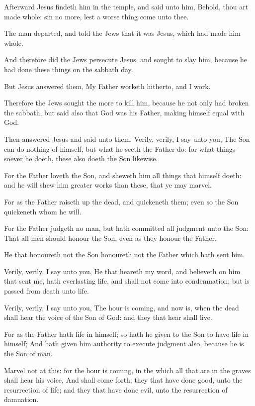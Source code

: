 \verse Afterward Jesus findeth him in the temple, and said unto him, Behold, thou art made whole: sin no more, lest a worse thing come unto thee.

\verse The man departed, and told the Jews that it was Jesus, which had made him whole.

\verse And therefore did the Jews persecute Jesus, and sought to slay him, because he had done these things on the sabbath day.

\verse But Jesus answered them, My Father worketh hitherto, and I work.

\verse Therefore the Jews sought the more to kill him, because he not only had broken the sabbath, but said also that God was his Father, making himself equal with God.

\verse Then answered Jesus and said unto them, Verily, verily, I say unto you, The Son can do nothing of himself, but what he seeth the Father do: for what things soever he doeth, these also doeth the Son likewise.

\verse For the Father loveth the Son, and sheweth him all things that himself doeth: and he will shew him greater works than these, that ye may marvel.

\verse For as the Father raiseth up the dead, and quickeneth them; even so the Son quickeneth whom he will.

\verse For the Father judgeth no man, but hath committed all judgment unto the Son: \verse That all men should honour the Son, even as they honour the Father.

He that honoureth not the Son honoureth not the Father which hath sent him.

\verse Verily, verily, I say unto you, He that heareth my word, and believeth on him that sent me, hath everlasting life, and shall not come into condemnation; but is passed from death unto life.

\verse Verily, verily, I say unto you, The hour is coming, and now is, when the dead shall hear the voice of the Son of God: and they that hear shall live.

\verse For as the Father hath life in himself; so hath he given to the Son to have life in himself; \verse And hath given him authority to execute judgment also, because he is the Son of man.

\verse Marvel not at this: for the hour is coming, in the which all that are in the graves shall hear his voice, \verse And shall come forth; they that have done good, unto the resurrection of life; and they that have done evil, unto the resurrection of damnation.

